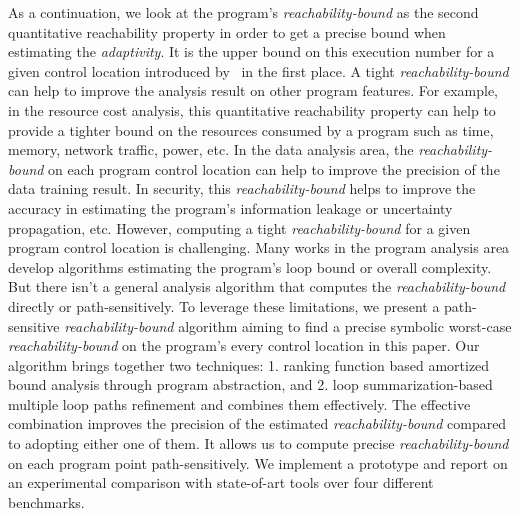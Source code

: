 As a continuation,
we look at the program's \emph{reachability-bound} as the second quantitative reachability property in order to get a precise bound when estimating the \emph{adaptivity}.
It is the upper bound on this execution number for 
a given control location introduced by~\cite{GulwaniZ10} in the first place.
A tight \emph{reachability-bound}
can help to improve the analysis result on other program features.
For example, in the resource cost analysis, this quantitative reachability property
can help to provide a tighter
bound on the resources consumed by a program such as time, memory,
network traffic, power, etc.
In the data analysis area,
the \emph{reachability-bound} on each program control location
can help to improve the precision of the data training result. 
In security, this \emph{reachability-bound} helps to improve the accuracy
in estimating the program's information leakage or uncertainty propagation, etc.
However, computing a tight \emph{reachability-bound} for a given program control location is challenging.
Many works in the program analysis area develop algorithms estimating the program's loop bound or overall complexity.
But there isn't a general analysis algorithm that
computes the \emph{reachability-bound}
directly or path-sensitively.
To leverage these limitations,
we present a path-sensitive \emph{reachability-bound} algorithm
aiming to find a precise symbolic worst-case \emph{reachability-bound} on the program's every control location in this paper.
Our algorithm brings together two techniques:
1. ranking function based amortized bound analysis through program abstraction, and
2. loop summarization-based multiple loop paths refinement
and combines them effectively. 
The effective combination improves the precision of the estimated \emph{reachability-bound} compared to adopting either one of them.
It allows us to compute precise \emph{reachability-bound} on each program point path-sensitively.
We implement a prototype and report on an experimental comparison with state-of-art tools over four different benchmarks.

